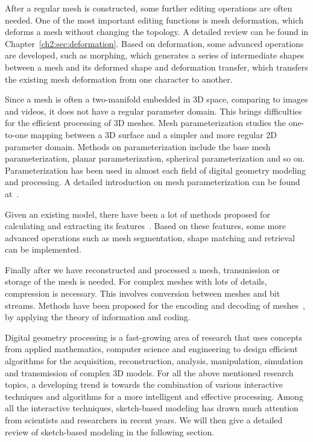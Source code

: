 After a regular mesh is constructed, some further editing operations are often needed. One of the most important editing functions is mesh deformation, which deforms a mesh without changing the topology. A detailed review can be found in Chapter~\ref{ch2:sec:deformation}. Based on deformation, some advanced operations are developed, such as morphing, which generates a series of intermediate shapes between a mesh and its deformed shape and deformation transfer, which transfers the existing mesh deformation from one character to another.

Since a mesh is often a two-manifold embedded in 3D space, comparing to images and videos, it does not have a regular parameter domain. This brings difficulties for the efficient processing of 3D meshes. Mesh parameterization studies the one-to-one mapping between a 3D surface and a simpler and more regular 2D parameter domain. Methods on parameterization include the base mesh parameterization, planar parameterization, spherical parameterization and so on. Parameterization has been used in almost each field of digital geometry modeling and processing. A detailed introduction on mesh parameterization can be found at~\cite{HLS07}.

Given an existing model, there have been a lot of methods proposed for calculating and extracting its features~\cite{GE05,CRT04,PWYLH07,OBS04,RVLL08}. Based on these features, some more advanced operations such as mesh segmentation, shape matching and retrieval can be implemented.

Finally after we have reconstructed and processed a mesh, transmission or storage of the mesh is needed. For complex meshes with lots of details, compression is necessary. This involves conversion between meshes and bit streams. Methods have been proposed for the encoding and decoding of meshes~\cite{JR99,SCT03,KSS00,AG05}, by applying the theory of information and coding.

Digital geometry processing is a fast-growing area of research that uses concepts from applied mathematics, computer science and engineering to design efficient algorithms for the acquisition, reconstruction, analysis, manipulation, simulation and transmission of complex 3D models. For all the above mentioned research topics, a developing trend is towards the combination of various interactive techniques and algorithms for a more intelligent and effective processing. Among all the interactive techniques, sketch-based modeling has drawn much attention from scientists and researchers in recent years. We will then give a detailed review of sketch-based modeling in the following section.


